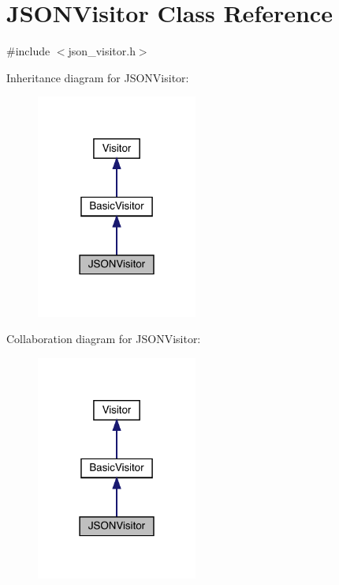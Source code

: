 \hypertarget{class_j_s_o_n_visitor}{}\section{J\+S\+O\+N\+Visitor Class Reference}
\label{class_j_s_o_n_visitor}


{\ttfamily \#include $<$json\+\_\+visitor.\+h$>$}



Inheritance diagram for J\+S\+O\+N\+Visitor\+:\nopagebreak
\begin{figure}[H]
\begin{center}
\leavevmode
\includegraphics[width=150pt]{class_j_s_o_n_visitor__inherit__graph}
\end{center}
\end{figure}


Collaboration diagram for J\+S\+O\+N\+Visitor\+:\nopagebreak
\begin{figure}[H]
\begin{center}
\leavevmode
\includegraphics[width=150pt]{class_j_s_o_n_visitor__coll__graph}
\end{center}
\end{figure}
